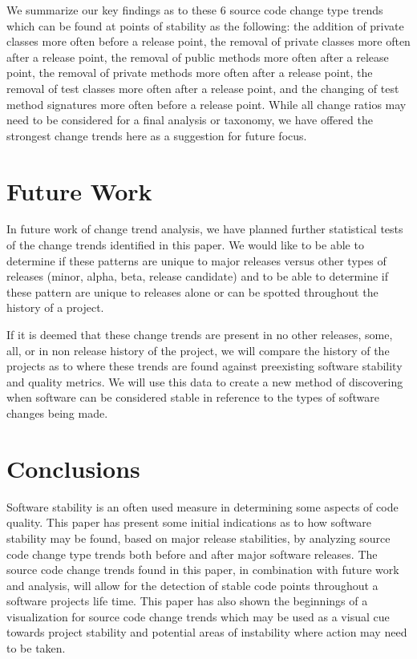 \documentclass[conference]{IEEEtran}
\begin{document}
We summarize our key findings as to these 6 source code change type trends which can be found at points of stability as the following: the addition of private classes more often
before a release point, the removal of private classes more often after a release point, the removal of public methods more often after a release point, 
the removal of private methods more often after a release point, the removal of test classes more often after a release point, and the changing of test method
signatures more often before a release point. While all change ratios may need to be considered for a final analysis or taxonomy, we have offered the strongest
change trends here as a suggestion for future focus.

\section{Future Work}
\label{sec:fut}

In future work of change trend analysis, we have planned further statistical tests of the change trends identified in this paper. We would like to
be able to determine if these patterns are unique to major releases versus other types of releases (minor, alpha, beta, release candidate) and to
be able to determine if these pattern are unique to releases alone or can be spotted throughout the history of a project.

If it is deemed that these change trends are present in no other releases, some, all, or in non release history of the project, we will
compare the history of the projects as to where these trends are found against preexisting software stability and quality metrics. We will use this data to
create a new method of discovering when software can be considered stable in reference to the types of software changes being made. 

\section{Conclusions}
\label{sec:con}

Software stability is an often used measure in determining some aspects of code quality. This paper has present some initial indications as to how
software stability may be found, based on major release stabilities, by analyzing source code change type trends both before and after major software
releases. The source code change trends found in this paper, in combination with future work and analysis, will allow for the detection of stable code
points throughout a software projects life time. This paper has also shown the beginnings of a visualization for source code change trends which may
be used as a visual cue towards project stability and potential areas of instability where action may need to be taken.




\end{document}
